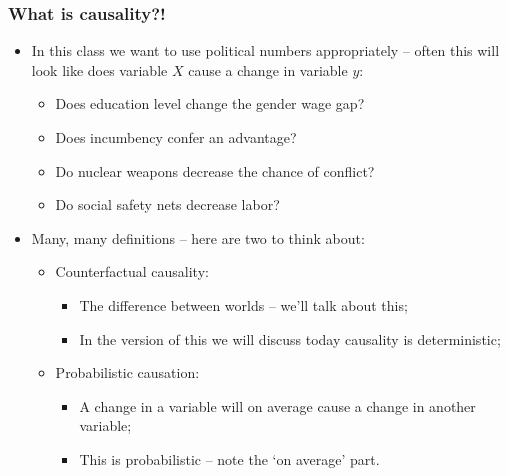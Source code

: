 \documentclass[aspectratio=169]{beamer}
\theoremstyle{principle}
\begin{document}
\begin{frame}
\frametitle{What is causality?!}
\begin{itemize}
\item In this class we want to use political numbers appropriately -- often this will look like does variable $X$ cause a change in variable $y$:%
\begin{itemize}
\item Does education level change the gender wage gap?
\item Does incumbency confer an advantage?
\item Do nuclear weapons decrease the chance of conflict?
\item Do social safety nets decrease labor?
\end{itemize}
\bigskip
\bigskip
\item Many, many definitions -- here are two to think about:
\begin{itemize}
\item Counterfactual causality:
\begin{itemize}
\item The difference between worlds -- we'll talk about this;
\item In the version of this we will discuss today causality is deterministic;
\end{itemize}
\item Probabilistic causation:
\begin{itemize}
\item A change in a variable will on average cause a change in another variable;
\item This is probabilistic -- note the `on average' part.
\end{itemize}
\end{itemize}
\end{itemize}
\end{frame}
\end{document}
